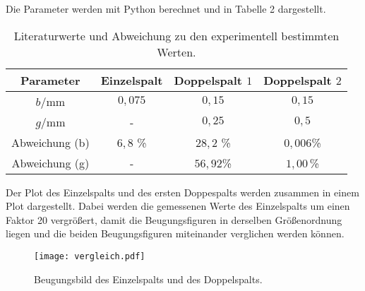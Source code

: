 Die Parameter werden mit Python berechnet und in Tabelle 2 dargestellt.
\begin{table}[H]
  \centering
  \caption{Literaturwerte \cite{sample} und Abweichung zu den experimentell bestimmten Werten.}
  \label{tab:Parameter}
  \begin{tabular}{c c c c}
    \toprule
    Parameter & Einzelspalt & Doppelspalt $1$ & Doppelspalt $2$ \\
    \midrule
     $b/$mm & $0,075$ & $0,15$ & $0,15$ \\
     $g/$mm & - & $0,25$ & $0,5$  \\
     \midrule
     Abweichung (b) & $6,8$ \% & $28,2$ \% & $0,006$\% \\
     Abweichung (g) & - & $56,92 $\% & $1,00\,$\% \\
    \bottomrule
  \end{tabular}
\end{table}


Der Plot des Einzelspalts und des ersten Doppespalts werden zusammen in einem Plot dargestellt. Dabei werden die gemessenen Werte des Einzelspalts um einen Faktor
20 vergrößert, damit die Beugungsfiguren in derselben Größenordnung liegen und die beiden Beugungsfiguren miteinander verglichen werden können.

\begin{figure}
  \centering
  \texttt{[image: vergleich.pdf]}
  \caption{Beugungsbild des Einzelspalts und des Doppelspalts.}
  \label{fig:plot}
\end{figure}


